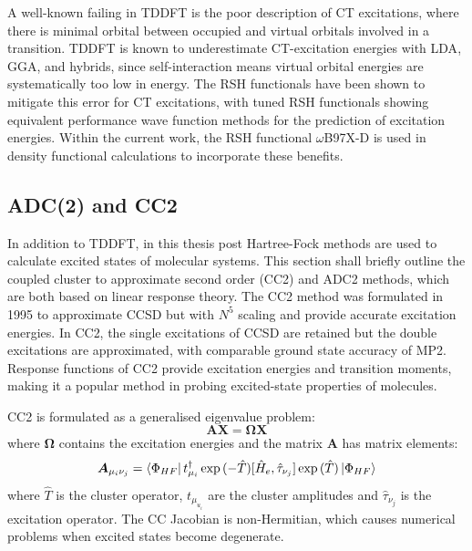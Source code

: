 A well-known failing in \ac{TDDFT} is the poor description of \acf{CT} excitations, where there is minimal orbital between occupied and virtual orbitals involved in a transition. TDDFT is known to underestimate \ac{CT}-excitation energies with \ac{LDA}, \ac{GGA}, and hybrids, since self-interaction means virtual orbital energies are systematically too low in energy. The \ac{RSH} functionals have been shown to mitigate this error for \ac{CT} excitations, with tuned \ac{RSH} functionals showing equivalent performance wave function methods for the prediction of excitation energies.\cite{Stein2009a,Kuritz2011,Kronik2012a} Within the current work, the \ac{RSH} functional $\omega$B97X-D is used in density functional calculations to incorporate these benefits.\cite{Chai2008} 

\subsection{ADC(2) and CC2}\label{section: methods_linear_response}
In addition to \ac{TDDFT}, in this thesis post Hartree-Fock methods are used to calculate excited states of molecular systems. This section shall briefly outline the coupled cluster to approximate second order (CC2) and \ac{ADC2} methods, which are both based on linear response theory. The \ac{CC}2 method was formulated in 1995 to approximate CCSD but with $N^{5}$ scaling and provide accurate excitation energies.\cite{Christiansen1995} In \ac{CC}2, the single excitations of CCSD are retained but the double excitations are approximated, with comparable ground state accuracy of MP2.\cite{Hattig2005} Response functions of \ac{CC}2 provide excitation energies and transition moments, making it a popular method in probing excited-state properties of molecules.\cite{Sneskov2012}

CC2 is formulated as a generalised eigenvalue problem:
\begin{equation}\label{equation: CC2}
    \bm{AX}=\bm{\Omega{}X}
\end{equation}
where $\bm{\Omega}$ contains the excitation energies and the matrix $\bm{A}$ has matrix elements:\cite{Sneskov2012}
\begin{equation}
    \bm{A}_{\mu_{i}\nu_{j}}=\bra{\Phi_{HF}}t^{\dagger}_{\mu_{i}}\exp{(-\hat{T})}[\hat{H}_{e},\hat{\tau}_{\nu_{j}}]\exp{(\hat{T})}\ket{\Phi_{HF}}
\end{equation}
where $\hat{T}$ is the cluster operator, $t_{\mu_{u_{i}}}$ are the cluster amplitudes and $\hat{\tau}_{\nu_{j}}$ is the excitation operator.\cite{Crespo-Otero2018} The CC Jacobian is non-Hermitian, which causes numerical problems when excited states become degenerate.\cite{Hattig2005,Crespo-Otero2018,Plasser2014}

